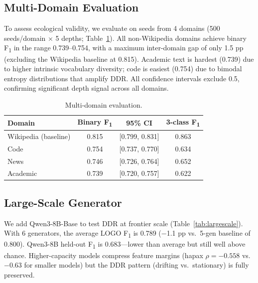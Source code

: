 \documentclass[11pt,a4paper]{article}
\newcommand{\fone}{F\textsubscript{1}}
\newcommand{\rhosp}{\rho}
\begin{document}
\subsection{Multi-Domain Evaluation}
\label{sec:domains}

To assess ecological validity, we evaluate on seeds from 4 domains (500 seeds/domain $\times$ 5 depths; Table~\ref{tab:domains}).
All non-Wikipedia domains achieve binary \fone{} in the range 0.739--0.754,
with a maximum inter-domain gap of only 1.5 pp (excluding the Wikipedia baseline at 0.815).
Academic text is hardest (0.739) due to higher intrinsic vocabulary diversity;
code is easiest (0.754) due to bimodal entropy distributions that amplify DDR.
All confidence intervals exclude 0.5, confirming significant depth signal across all domains.

\begin{table}[t]
\centering
\caption{Multi-domain evaluation.}
\label{tab:domains}
\begin{tabular}{lccc}
\toprule
\textbf{Domain} & \textbf{Binary \fone{}} & \textbf{95\% CI} & \textbf{3-class \fone{}} \\
\midrule
Wikipedia (baseline) & 0.815 & {[0.799, 0.831]} & 0.863 \\
Code & 0.754 & {[0.737, 0.770]} & 0.634 \\
News & 0.746 & {[0.726, 0.764]} & 0.652 \\
Academic & 0.739 & {[0.720, 0.757]} & 0.622 \\
\bottomrule
\end{tabular}
\end{table}

\subsection{Large-Scale Generator}
\label{sec:large_scale}

We add Qwen3-8B-Base to test DDR at frontier scale (Table~\ref{tab:largescale}).
With 6 generators, the average LOGO \fone{} is 0.789 ($-$1.1 pp vs.\ 5-gen baseline of 0.800).
Qwen3-8B held-out \fone{} is 0.683---lower than average but still well above chance.
Higher-capacity models compress feature margins (hapax $\rhosp = -0.558$ vs.\ $-0.63$ for smaller models)
but the DDR pattern (drifting vs.\ stationary) is fully preserved.
\end{document}
